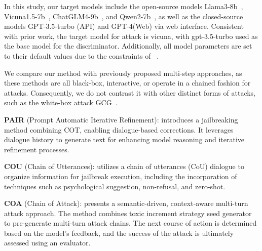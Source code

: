 
In this study, our target models include the open-source models Llama3-8b~\cite{touvron2023llama}, Vicuna1.5-7b~\cite{lmsys_vicuna_7b_v1_5}, ChatGLM4-9b~\cite{glm2024chatglm}, and Qwen2-7b~\cite{bai2023qwen}, as well as the closed-source models GPT-3.5-turbo (API)\cite{openai_chatgpt} and GPT-4(Web) via web interface\cite{openai_chatgpt}. Consistent with prior work, the target model for attack is vicuna, with gpt-3.5-turbo used as the base model for the discriminator. Additionally, all model parameters are set to their default values due to the constraints of ~\cite{huang2024catastrophic}.

\label{baseline}
We compare our method with previously proposed multi-step approaches, as these methods are all black-box, interactive, or operate in a chained fashion for attacks. Consequently, we do not contrast it with other distinct forms of attacks, such as the white-box attack GCG~\cite{zou2023universal}.

\textbf{PAIR} (Prompt Automatic Iterative Refinement): \cite{chao2023jailbreaking} introduces a jailbreaking method combining COT, enabling dialogue-based corrections. It leverages dialogue history to generate text for enhancing model reasoning and iterative refinement processes.

\textbf{COU} (Chain of Utterances): \cite{bhardwaj2023red} utilizes a chain of utterances (CoU) dialogue to organize information for jailbreak execution, including the incorporation of techniques such as psychological suggestion, non-refusal, and zero-shot.

\textbf{COA} (Chain of Attack): \cite{yang2024chain} presents a semantic-driven, context-aware multi-turn attack approach. The method combines toxic increment strategy seed generator to pre-generate multi-turn attack chains. The next course of action is determined based on the model's feedback, and the success of the attack is ultimately assessed using an evaluator.


